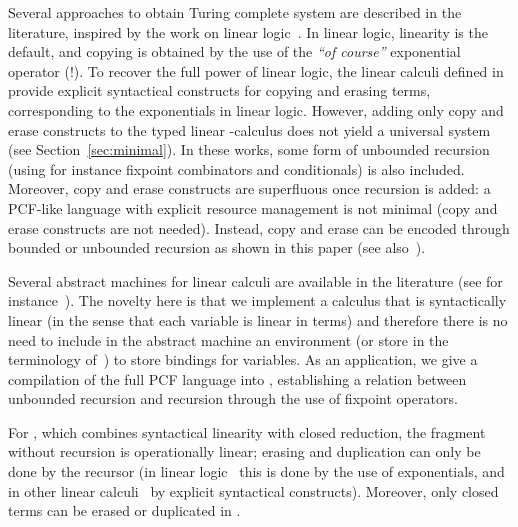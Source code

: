 \documentclass{article}
\begin{document}
Several approaches to obtain Turing complete system are described in
the literature, inspired by the work on linear
logic~\cite{GirardJY:linl}. In linear logic, linearity is the default,
and copying is obtained by the use of the \emph{``of course''}
exponential operator (!). To recover the full power of linear logic,
the linear calculi defined
in~\cite{AbramskyS:comill,MackieIC:lilfpl,HolmstromS:linfp} provide
explicit syntactical constructs for copying and erasing terms,
corresponding to the exponentials in linear logic.  However, adding
only copy and erase constructs to the typed linear -calculus
does not yield a universal system (see Section~\ref{sec:minimal}). In these works, some form of
unbounded recursion (using for instance fixpoint combinators and
conditionals) is also included.  Moreover, copy and erase constructs
are superfluous once recursion is added: a PCF-like language with
explicit resource management is not minimal (copy and erase constructs
are not needed).  Instead, copy and erase can be encoded through bounded or unbounded
recursion as shown in this paper (see also~\cite{MillerD:leagfp,AlvesS:phd,MackieIC:linearT}).


Several abstract machines for linear calculi are available in the
literature (see for
instance~\cite{MackieIC:geoim,David_WalkerChapter,LafontY:linam}). The
novelty here is that we implement a calculus that is syntactically
linear (in the sense that each variable is linear in  terms)
and therefore there is no need to include in the abstract machine an
environment (or store in the terminology
of~\cite{David_WalkerChapter}) to store bindings for variables.  As an
application, we give a compilation of the full PCF language into
, establishing a relation between unbounded recursion and
recursion through the use of fixpoint operators. 


 For , which
combines syntactical linearity with closed reduction, the fragment
without recursion is operationally linear; erasing and duplication can
only be done by the recursor (in linear logic~\cite{GirardJY:linl}
this is done by the use of exponentials, and in other linear
calculi~\cite{AbramskyS:comill,MackieIC:lilfpl,HolmstromS:linfp,David_WalkerChapter}
by explicit syntactical constructs). Moreover, only closed terms can
be erased or duplicated in .
\end{document}
